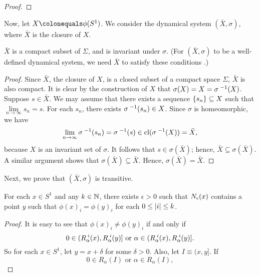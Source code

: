 \documentclass[10pt,twoside,draft]{book}
\begin{document}
\begin{example}
\begin{proposition}
\begin{proof}
    \end{proof}
  \end{proposition}
  Now, let $X \ceq \phi(S^1)$.
  We consider the dynamical system $(\bar{X}, \sigma)$, where $\bar{X}$ is the closure of $X$.
  \begin{proposition}
    $\bar{X}$ is a compact subset of $\Sigma$, and is invariant under $\sigma$.
    (For $(\bar{X}, \sigma)$ to be a well-defined dynamical system, we need $\bar{X}$ to satisfy these conditions \citep[p.179]{lind}.)
    \begin{proof}
      Since $\bar{X}$, the closure of $X$, is a closed subset of a compact space $\Sigma$, $\bar{X}$ is also compact.
      It is clear by the construction of $X$ that $\sigma(X) = X = \sigma^{\;-1}(X)$.
      Suppose $s \in \bar{X}$.
      We may assume that there exists a sequence $\left \{ s_n \right \} \subseteq X$ such that $\lim\limits_{n \to \infty} s_n = s$.
      For each $s_n$, there exists $\sigma^{\;-1}(s_n) \in X$.
      Since $\sigma$ is homeomorphic, we have 
      \begin{equation*}
        \lim\limits_{n \to \infty} \sigma^{\;-1}(s_n) 
        = \sigma^{\;-1}(s) 
        \in \mathrm{cl}(\sigma^{\;-1}(X)) 
        = \bar{X},
      \end{equation*}
      because $X$ is an invariant set of $\sigma$.
      It follows that $s \in \sigma(\bar{X})$; hence, $\bar{X} \subseteq \sigma(\bar{X})$.
      A similar argument shows that $\sigma(\bar{X}) \subseteq \bar{X}$.
      Hence, $\sigma(\bar{X}) = \bar{X}$.
    \end{proof}
  \end{proposition}
  Next, we prove that $(\bar{X}, \sigma)$ is transitive.
  \begin{lemma}
    For each $x \in S^1$ and any $k \in \mathbb{N}$, there exists $\epsilon > 0$ such that $N_{\epsilon}(x)$ contains a point $y$ such that 
    $\phi(x)_i = \phi(y)_i$ for each $0 \leq \left | i \right | \leq k$.
    \label{lem:sturmian2}
    \begin{proof}
      It is easy to see that $\phi(x)_i \neq \phi(y)_i$ if and only if
      \begin{equation*}
      0 \in (\itr{R_\alpha}{i}(x), \itr{R_\alpha}{i}(y)] \mbox{ or } \alpha \in (\itr{R_\alpha}{i}(x), \itr{R_\alpha}{i}(y)]. %
    \end{equation*}
    So for each $x \in S^1$, let $y = x + \delta$ for some $\delta > 0$.
  Also, let $I \equiv (x, y]$.
  If 
  \begin{equation*}
    0 \in R_\alpha(I) \mbox{ or } \alpha \in R_\alpha(I), 

\end{equation*}
\end{proof}
\end{lemma}
\end{example}
\end{document}
